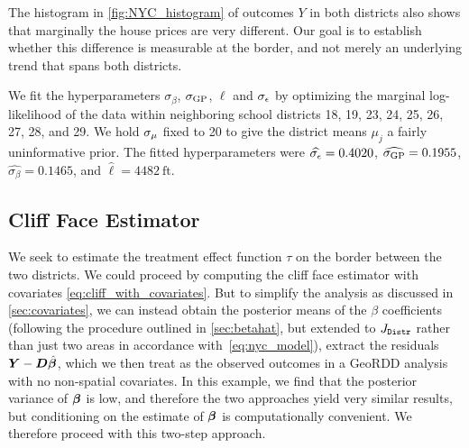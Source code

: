 \documentclass[12pt]{article}
\begin{document}
The histogram in \autoref{fig:NYC_histogram} of outcomes \(Y\) in both districts also shows that marginally the house prices are very different.
Our goal is to establish whether this difference is measurable at the border, and not merely an underlying trend that spans both districts.

We fit the hyperparameters \(\sigma_\beta\), \(\sigma_{\mathrm{GP}}\), \(\ell\) and \(\sigma_{\epsilon}\) by optimizing the marginal log-likelihood of the data within neighboring school districts 18, 19, 23, 24, 25, 26, 27, 28, and 29.
We hold \(\sigma_{\mu}\) fixed to 20 to give the district means \(\mu_j\) a fairly uninformative prior.
The fitted hyperparameters were \(\widehat{\sigma_{\epsilon}}=0.4020\), \(\widehat{\sigma_{\mathrm{GP}}}=0.1955\), \(\widehat{\sigma_\beta}=0.1465\), and \(\widehat{\ell}=4482~\text{ft}\).

\subsection{Cliff Face Estimator}

We seek to estimate the treatment effect function \(\tau\) on the border between the two districts.
We could proceed by computing the cliff face estimator with covariates \autoref{eq:cliff_with_covariates}.
But to simplify the analysis as discussed in \autoref{sec:covariates}, we can instead obtain the posterior means of the \(\beta\) coefficients (following the procedure outlined in \autoref{sec:betahat}, but extended to \(J_{\mathtt{Distr}}\) rather than just two areas in accordance with~\autoref{eq:nyc_model}), extract the residuals \(\bm{Y}{}-\bm{D} \hat{\bm{\beta}}\), which we then treat as the observed outcomes in a GeoRDD analysis with no non-spatial covariates.
In this example, we find that the posterior variance of \(\bm{\beta}\) is low, and therefore the two approaches yield very similar results, but conditioning on the estimate of \(\bm{\beta}\) is computationally convenient.
We therefore proceed with this two-step approach.
\end{document}
